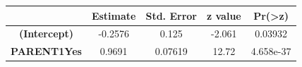 \documentclass[]{article}
\begin{document}
\begin{longtable}[]{@{}ccccc@{}}
\toprule
\begin{minipage}[b]{0.33\columnwidth}\centering\strut
~\strut
\end{minipage} & \begin{minipage}[b]{0.14\columnwidth}\centering\strut
Estimate\strut
\end{minipage} & \begin{minipage}[b]{0.14\columnwidth}\centering\strut
Std. Error\strut
\end{minipage} & \begin{minipage}[b]{0.11\columnwidth}\centering\strut
z value\strut
\end{minipage} & \begin{minipage}[b]{0.12\columnwidth}\centering\strut
Pr(\textgreater{}\textbar{}z\textbar{})\strut
\end{minipage}\tabularnewline
\midrule
\endhead
\begin{minipage}[t]{0.33\columnwidth}\centering\strut
\textbf{(Intercept)}\strut
\end{minipage} & \begin{minipage}[t]{0.14\columnwidth}\centering\strut
-0.2576\strut
\end{minipage} & \begin{minipage}[t]{0.14\columnwidth}\centering\strut
0.125\strut
\end{minipage} & \begin{minipage}[t]{0.11\columnwidth}\centering\strut
-2.061\strut
\end{minipage} & \begin{minipage}[t]{0.12\columnwidth}\centering\strut
0.03932\strut
\end{minipage}\tabularnewline
\begin{minipage}[t]{0.33\columnwidth}\centering\strut
\textbf{PARENT1Yes}\strut
\end{minipage} & \begin{minipage}[t]{0.14\columnwidth}\centering\strut
0.9691\strut
\end{minipage} & \begin{minipage}[t]{0.14\columnwidth}\centering\strut
0.07619\strut
\end{minipage} & \begin{minipage}[t]{0.11\columnwidth}\centering\strut
12.72\strut
\end{minipage} & \begin{minipage}[t]{0.12\columnwidth}\centering\strut
4.658e-37\strut
\end{minipage}\tabularnewline

\end{longtable}
\end{document}
